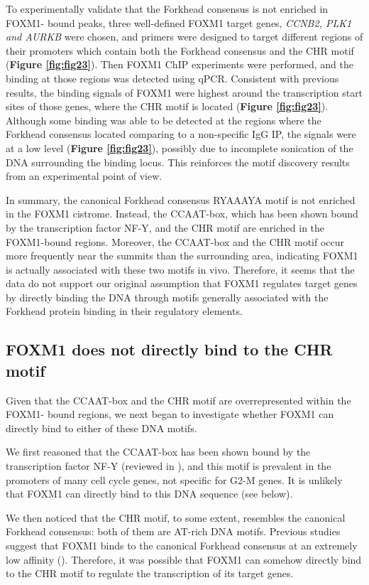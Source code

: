 To experimentally validate that the Forkhead consensus is not enriched in FOXM1- bound peaks, three well-defined FOXM1 target genes, \textit{CCNB2, PLK1 and AURKB} were chosen, and primers were designed to target different regions of their promoters which contain both the Forkhead consensus and the CHR motif (\textbf{Figure \ref{fig:fig23}}). Then FOXM1 ChIP experiments were performed, and the binding at those regions was detected using qPCR. Consistent with previous results, the binding signals of FOXM1 were highest around the transcription start sites of those genes, where the CHR motif is located (\textbf{Figure \ref{fig:fig23}}). Although some binding was able to be detected at the regions where the Forkhead consensus located comparing to a non-specific IgG IP, the signals were at a low level (\textbf{Figure \ref{fig:fig23}}), possibly due to incomplete sonication of the DNA surrounding the binding locus. This reinforces the motif discovery results from an experimental point of view.

In summary, the canonical Forkhead consensus RYAAAYA motif is not enriched in the FOXM1 cistrome. Instead, the CCAAT-box, which has been shown bound by the transcription factor NF-Y, and the CHR motif are enriched in the FOXM1-bound regions. Moreover, the CCAAT-box and the CHR motif occur more frequently near the summits than the surrounding area, indicating FOXM1 is actually associated with these two motifs in vivo. Therefore, it seems that the data do not support our original assumption that FOXM1 regulates target genes by directly binding the DNA through motifs generally associated with the Forkhead protein binding in their regulatory elements.

\subsection{FOXM1 does not directly bind to the CHR motif}

Given that the CCAAT-box and the CHR motif are overrepresented within the FOXM1- bound regions, we next began to investigate whether FOXM1 can directly bind to either of these DNA motifs.

We first reasoned that the CCAAT-box has been shown bound by the transcription factor NF-Y (reviewed in \cite{mantovani1999the}), and this motif is prevalent in the promoters of many cell cycle genes, not specific for G2-M genes. It is unlikely that FOXM1 can directly bind to this DNA sequence (see below).

We then noticed that the CHR motif, to some extent, resembles the canonical Forkhead consensus: both of them are AT-rich DNA motifs. Previous studies suggest that FOXM1 binds to the canonical Forkhead consensus at an extremely low affinity (\cite{freddie2007functional,littler2010structure}). Therefore, it was possible that FOXM1 can somehow directly bind to the CHR motif to regulate the transcription of its target genes.

